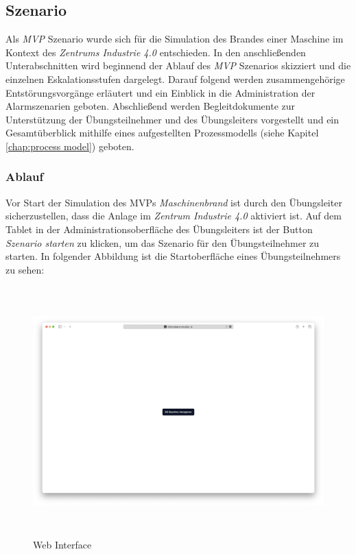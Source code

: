 \subsection{Szenario}

Als \textit{MVP} Szenario wurde sich für die Simulation des Brandes einer Maschine im Kontext des \textit{Zentrums Industrie 4.0} entschieden. In den anschließenden Unterabschnitten wird beginnend der Ablauf des \textit{MVP} Szenarios skizziert und die einzelnen Eskalationsstufen dargelegt. Darauf folgend werden zusammengehörige Entstörungsvorgänge erläutert und ein Einblick in die Administration der Alarmszenarien geboten. Abschließend werden Begleitdokumente zur Unterstützung der Übungsteilnehmer und des Übungsleiters vorgestellt und ein Gesamtüberblick mithilfe eines aufgestellten Prozessmodells (siehe Kapitel \ref{chap:process model}) geboten.

\subsubsection{Ablauf}

Vor Start der Simulation des MVPs \textit{Maschinenbrand} ist durch den Übungsleiter sicherzustellen, dass die Anlage im \textit{Zentrum Industrie 4.0} aktiviert ist. Auf dem Tablet in der Administrationsoberfläche des Übungsleiters ist der Button \textit{Szenario starten} zu klicken, um das Szenario für den Übungsteilnehmer zu starten. In folgender Abbildung ist die Startoberfläche eines Übungsteilnehmers zu sehen:

\begin{figure}[h]
    \includegraphics[width=15cm, height=9.61cm]{res/web_interface.png}
    \centering
   \caption{Web Interface}
\end{figure}

